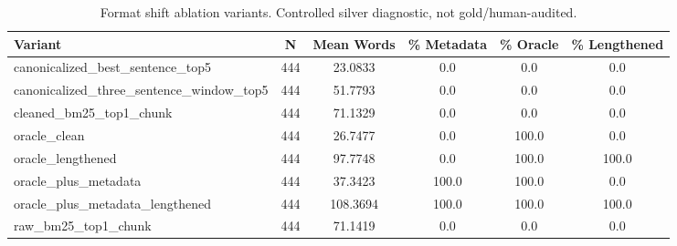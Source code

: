 \begin{table}[ht]
\centering
\caption{Format shift ablation variants. Controlled silver diagnostic, not gold/human-audited.}
\label{tab:format_shift}
\begin{tabular}{lccccc}
\toprule
Variant & N & Mean Words & \% Metadata & \% Oracle & \% Lengthened \\
\midrule
canonicalized_best_sentence_top5 & 444 & 23.0833 & 0.0 & 0.0 & 0.0 \\
canonicalized_three_sentence_window_top5 & 444 & 51.7793 & 0.0 & 0.0 & 0.0 \\
cleaned_bm25_top1_chunk & 444 & 71.1329 & 0.0 & 0.0 & 0.0 \\
oracle_clean & 444 & 26.7477 & 0.0 & 100.0 & 0.0 \\
oracle_lengthened & 444 & 97.7748 & 0.0 & 100.0 & 100.0 \\
oracle_plus_metadata & 444 & 37.3423 & 100.0 & 100.0 & 0.0 \\
oracle_plus_metadata_lengthened & 444 & 108.3694 & 100.0 & 100.0 & 100.0 \\
raw_bm25_top1_chunk & 444 & 71.1419 & 0.0 & 0.0 & 0.0 \\
\bottomrule
\end{tabular}
\end{table}